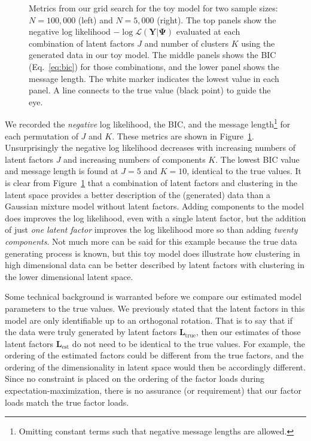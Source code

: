 \documentclass[twocolumn]{aastex62}
\newcommand{\vect}[1]{\boldsymbol{\mathbf{#1}}}
\renewcommand{\vec}[1]{\vect{#1}}
\newcommand{\data}{\textbf{Y}}
\newcommand{\factorloads}{\textbf{L}}
\newcommand{\NumLatentFactors}{J}
\newcommand{\NumComponents}{K}
\begin{document}
\begin{figure}
\begin{tabular}[b]{@{}p{}@{}}
	\end{tabular}
    \caption{Metrics from our grid search for the toy model for two sample sizes: 
    		 $N = 100,000$ (left) and $N = 5,000$ (right). 
    		 The top panels show the negative log likelihood
			 $-\log{\mathcal{L}\left(\data|\vec\Psi\right)}$ 
			 evaluated at each combination of latent factors 
			 $\NumLatentFactors$ and number of clusters 
			 $\NumComponents$ using the generated data in our toy model.
			 The middle panels shows 
			 the BIC (Eq.~\ref{eq:bic}) for those 
			 combinations, and the lower panel shows the 
			 message length. The white marker indicates the
			 lowest value in each panel. A line connects to the true value (black point) to guide the eye.}
    \label{fig:experiment-1-gridsearch}
\end{figure}
\vspace{-50em}



We recorded the \emph{negative} log likelihood, the BIC, and the message length\footnote{Omitting constant terms such that negative message lengths are allowed.}  for each permutation of $\NumLatentFactors$ and $\NumComponents$.
These metrics are shown in Figure~\ref{fig:experiment-1-gridsearch}.
Unsurprisingly the negative log likelihood decreases with increasing numbers of latent
factors $\NumLatentFactors$ and increasing numbers of components $\NumComponents$.
The lowest BIC value and message length is found at $\NumLatentFactors = 5$
and $\NumComponents = 10$, identical to the true values.
It is clear from Figure~\ref{fig:experiment-1-gridsearch} that a combination of latent factors
and clustering in the latent space provides a better description of the (generated) data than a Gaussian mixture model without latent factors.
Adding components to the model does improves the log likelihood, even with a single latent factor,
but the addition of just \emph{one latent factor} improves the log likelihood more so than adding
\emph{twenty components}. Not much more can be said for this example because the true data generating process 
is known, but this toy model does illustrate how 
clustering in high dimensional data can be better described by latent factors with 
clustering in the lower dimensional latent space.




Some technical background is warranted before we compare our estimated model
parameters to the true values. We previously stated that the latent factors in this model are only
identifiable up to an orthogonal rotation. That is to say that
if the data were truly generated by latent factors $\factorloads_\textrm{true}$,
then our estimates of those latent factors $\factorloads_\textrm{est}$ do not need
to be identical to the true values. For example, the ordering of the estimated factors
could be different from the true factors, and the ordering of the dimensionality
in latent space would then be accordingly different. Since no constraint is
placed on the ordering of the factor loads during expectation-maximization,
there is no assurance (or requirement) that our factor loads match the true factor loads.
\end{document}
